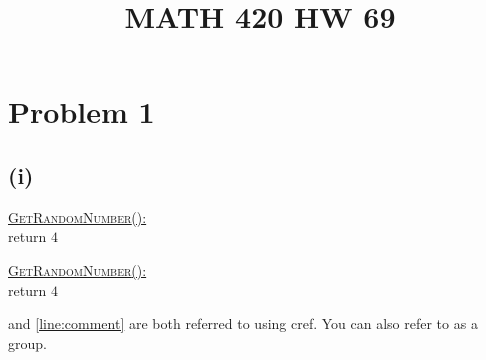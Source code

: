 \documentclass[letterpaper]{article}
\title{MATH 420 HW 69}
\begin{document}
\header

\section*{Problem 1}
\subsection*{(i)}

\begin{algo}
    \underline{\textsc{GetRandomNumber}():}\+
\\      return $4$   
\\      \hspace{36.75pt}
\end{algo}
    
\begin{nalgo}[1.3]
        \underline{\textsc{GetRandomNumber}():}\+
\\\label{line:ret}  return $4$   
\\\label{line:comment}  \hspace{36.75pt}
\end{nalgo}

 and \cref{line:comment} are both referred to using cref. You can also refer to  as a group.
\end{document}
